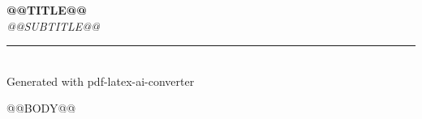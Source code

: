 \documentclass[11pt,a4paper]{article}
\begin{document}
\begin{titlepage}
  \vspace*{3cm}
  \begin{center}
    {\fontsize{24}{30}\selectfont\bfseries @@TITLE@@}\\[0.8em]
    {\fontsize{14}{18}\selectfont\itshape @@SUBTITLE@@}\\[2em]
    \rule{0.55\textwidth}{0.6pt}\\[1.5em]
    {\normalsize Generated with pdf-latex-ai-converter}\\
  \end{center}
  \vfill
  \restoregeometry
\end{titlepage}

\clearpage

\renewcommand{\contentsname}{Contents}
\setcounter{tocdepth}{2}
\tableofcontents
\clearpage

@@BODY@@
\end{document}
